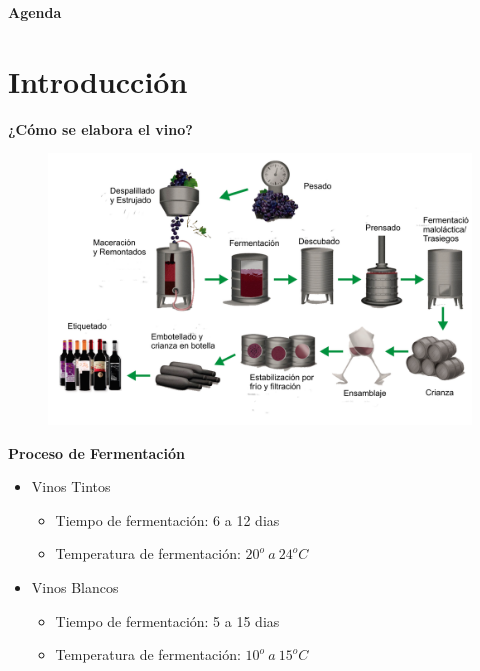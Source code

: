 \documentclass[11pt]{beamer}
\begin{document}
\begin{frame}{\textbf{\LARGE{Agenda}}}
  \fontsize{18pt}{18}\selectfont
  \tableofcontents
\end{frame}

\section{Introducción}

\begin{frame}{\textbf{\LARGE{¿Cómo se elabora el vino?}}}
  \fontsize{18pt}{18}\selectfont
  \hspace{-40px}
  \vspace{-30px}
  \begin{figure}[H]
    \includegraphics[width=1\textwidth]{./imagenes/elaboracion-del-vino-tinto.png}
  \end{figure}	  	  	
\end{frame}

\begin{frame}{\LARGE{\textbf{Proceso de Fermentación}}}
  \begin{itemize}
      \vspace{15px}
    \item Vinos Tintos
      \vspace{5px}
      \begin{itemize}
        \item Tiempo de fermentación: 6 a 12 dias
        \vspace{5px}
        \item Temperatura de fermentación: $20^o\ a\ 24^oC$
      \end{itemize}
        \vspace{15px}
      \item Vinos Blancos
        \vspace{5px}
        \begin{itemize}
          \item Tiempo de fermentación: 5 a 15 dias
          \vspace{5px}
          \item Temperatura de fermentación: $10^o\ a\ 15^oC$
        \end{itemize}
  \end{itemize}	
\end{frame}
\end{document}
